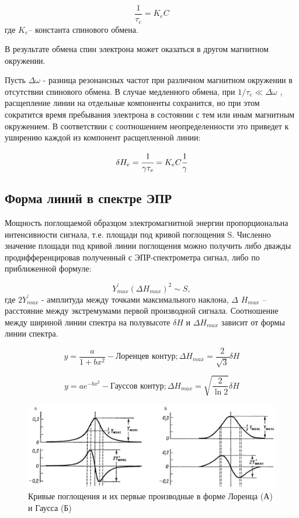 \documentclass{article}
\begin{document}
\begin{equation}
\frac{1}{ \tau_{e}}=K_{e}C
\end{equation}
где $K_e$– константа спинового обмена.

В результате обмена спин электрона может оказаться в другом магнитном окружении.

Пусть $ \Delta  \omega $  - разница резонансных частот при различном магнитном окружении в отсутствии спинового обмена. В случае медленного обмена, при $1/ \tau_e \ll \Delta \omega $ , расщепление линии на отдельные компоненты сохранится, но при этом сократится время пребывания электрона в состоянии с тем или иным магнитным окружением. В соответствии с соотношением неопределенности это приведет к уширению каждой из компонент расщепленной линии:

\begin{equation}\label{spin}
\delta H_{e}=\cfrac{1}{\gamma \tau_e} = K_e C \cfrac{1}{\gamma}
\end{equation}

\subsection{Форма линий в спектре ЭПР}
Мощность поглощаемой образцом электромагнитной энергии пропорциональна интенсивности сигнала, т.е. площади под кривой поглощения S. Численно значение площади под кривой линии поглощения можно получить либо дважды продифференцировав полученный с ЭПР-спектрометра сигнал, либо по приближенной формуле: 

\begin{equation}\label{s}
Y_{max}^{'} \left(  \Delta H_{max} \right) ^{2}\sim S,
\end{equation}
где $2Y_{max}^{'}$ - амплитуда между точками максимального наклона, $ \Delta $ $H_{max}$ – расстояние между экстремумами первой производной сигнала. Соотношение между шириной линии спектра на полувысоте $ \delta H $ и $ \Delta H_{max}$ зависит от формы линии спектра.

\begin{equation}
y=\frac{a}{1+bx^{2}} - \text{Лоренцев контур}; \Delta H_{max} = \frac{2}{\sqrt{3}}\delta H
\end{equation}
 

\begin{equation}
y=ae^{-bx^{2}} - \text{Гауссов контур}; \Delta H_{max} = \sqrt{\frac{2}{\ln 2}}\delta H
\end{equation}

\begin{figure}[h!]
	\includegraphics[scale = 0.5]{pic4.png}
	\caption{Кривые поглощения и их первые производные в форме Лоренца (А) и
		Гаусса (Б)}
	\label{cont}
\end{figure}
\end{document}
